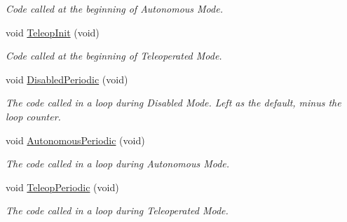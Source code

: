 \begin{DoxyCompactItemize}
\begin{DoxyCompactList}\small\item\em Code called at the beginning of Autonomous Mode. \item\end{DoxyCompactList}\item 
\hypertarget{class_builtin_default_code_a33c90462b66a06f319170b0ce2712832}{
void \hyperlink{class_builtin_default_code_a33c90462b66a06f319170b0ce2712832}{TeleopInit} (void)}
\label{class_builtin_default_code_a33c90462b66a06f319170b0ce2712832}

\begin{DoxyCompactList}\small\item\em Code called at the beginning of Teleoperated Mode. \item\end{DoxyCompactList}\item 
\hypertarget{class_builtin_default_code_a44735b87ee0edb507a926d5195a64c69}{
void \hyperlink{class_builtin_default_code_a44735b87ee0edb507a926d5195a64c69}{DisabledPeriodic} (void)}
\label{class_builtin_default_code_a44735b87ee0edb507a926d5195a64c69}

\begin{DoxyCompactList}\small\item\em The code called in a loop during Disabled Mode. Left as the default, minus the loop counter. \item\end{DoxyCompactList}\item 
\hypertarget{class_builtin_default_code_a5ff19c03a26ad9d272abc3062e8a1c51}{
void \hyperlink{class_builtin_default_code_a5ff19c03a26ad9d272abc3062e8a1c51}{AutonomousPeriodic} (void)}
\label{class_builtin_default_code_a5ff19c03a26ad9d272abc3062e8a1c51}

\begin{DoxyCompactList}\small\item\em The code called in a loop during Autonomous Mode. \item\end{DoxyCompactList}\item 
\hypertarget{class_builtin_default_code_a7efff3a52c7626cd30a8d150bb4c6b96}{
void \hyperlink{class_builtin_default_code_a7efff3a52c7626cd30a8d150bb4c6b96}{TeleopPeriodic} (void)}
\label{class_builtin_default_code_a7efff3a52c7626cd30a8d150bb4c6b96}

\begin{DoxyCompactList}\small\item\em The code called in a loop during Teleoperated Mode. \item\end{DoxyCompactList}\end{DoxyCompactItemize}
